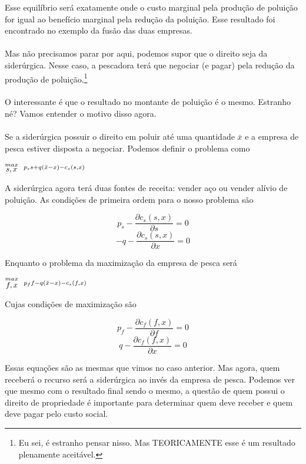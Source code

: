 \documentclass[a4paper,11pt,oneside]{book}
\theoremstyle{definition}
\theoremstyle{break}
\begin{document}
Esse equilíbrio será exatamente onde o custo marginal pela produção de poluição for igual ao benefício marginal pela redução da poluição. Esse resultado foi encontrado no exemplo da fusão das duas empresas.
\\~\\
Mas não precisamos parar por aqui, podemos supor que o direito seja da siderúrgica. Nesse caso, a pescadora terá que negociar (e pagar) pela redução da produção de poluição.\footnote{Eu sei, é estranho pensar nisso. Mas TEORICAMENTE esse é um resultado plenamente aceitável.}
\\~\\
O interessante é que o resultado no montante de poluição é o mesmo. Estranho né? Vamos entender o motivo disso agora.
\\~\\
Se a siderúrgica possuir o direito em poluir até uma quantidade $\bar{x}$ e a empresa de pesca estiver disposta a negociar. Podemos definir o problema como

\begin{center}
	\LARGE $ \stackrel{max}{\text{\small $s,x$}} \ \ %
	\stackrel{p_ss + q(\bar{x} - x) - c_s(s,x)}{\ } $ %
\end{center}

A siderúrgica agora terá duas fontes de receita: vender aço ou vender alívio de poluição. As condições de primeira ordem para o nosso problema são

$$ p_s - \frac{\partial c_s(s,x)}{\partial s} = 0 $$
$$ -q - \frac{\partial c_s(s,x)}{\partial x} = 0 $$

Enquanto o problema da maximização da empresa de pesca será

\begin{center}
	\LARGE $ \stackrel{max}{\text{\small $f,x$}} \ \ %
	\stackrel{p_ff - q(\bar{x} - x) - c_s(f,x)}{\ } $ %
\end{center}

Cujas condições de maximização são

$$ p_f - \frac{\partial c_f(f,x)}{\partial f} = 0 $$
$$ q - \frac{\partial c_f(f,x)}{\partial x} = 0 $$

Essas equações são as mesmas que vimos no caso anterior. Mas agora, quem receberá o recurso será a siderúrgica ao invés da empresa de pesca. Podemos ver que mesmo com o resultado final sendo o mesmo, a questão de quem possui o direito de propriedade é importante para determinar quem deve receber e quem deve pagar pelo custo social.
\end{document}
